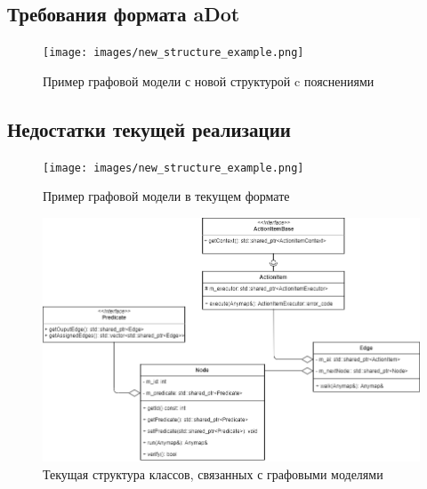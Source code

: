 \subsection{Требования формата aDot}
\begin{frame}%
	\begin{figure}
		\centering
		\texttt{[image: images/new\_structure\_example.png]}
		\caption{Пример графовой модели с новой структурой c пояснениями}
	\end{figure}
\end{frame}
\subsection{Недостатки текущей реализации}
\begin{frame}
	\begin{figure}
			\centering
			\texttt{[image: images/new\_structure\_example.png]}
			\caption{Пример графовой модели в текущем формате}
	\end{figure}
\end{frame}

\begin{frame}
	\begin{figure}
		\centering
		\includegraphics[width=\textwidth]{images/structure.png}
		\caption{Текущая структура классов, связанных с графовыми моделями}
	\end{figure}
\end{frame}


